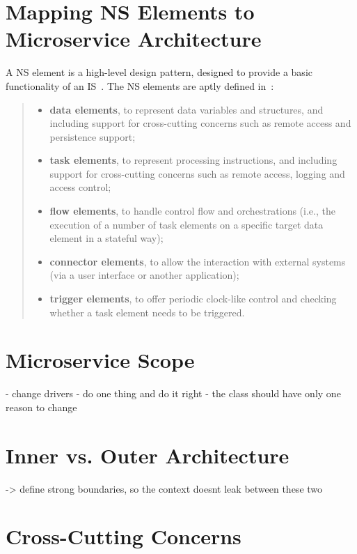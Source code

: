 \documentclass[thesis=M,english,hidelinks]{FITthesis}[2012/10/20]
\begin{document}
\section{Mapping NS Elements to Microservice Architecture}
\label{sec:mapping_ns_elems}

A \acrshort{NS} element is a high-level design pattern, designed to provide a basic functionality of an \acrlong{IS}~\cite{ns-toward-general-theory}. The \acrshort{NS} elements are aptly defined in~\cite{ns-in-practice}:
\begin{quote}
    \begin{itemize}
        \item \textbf{data elements}, to represent data variables and structures, and including support for cross-cutting concerns such as remote access and persistence support;
        \item \textbf{task elements}, to represent processing instructions, and including support for cross-cutting concerns such as remote access, logging and access control;
        \item \textbf{flow elements}, to handle control flow and orchestrations (i.e., the execution of a number of task elements on a specific target data element in a stateful way);
        \item \textbf{connector elements}, to allow the interaction with external systems (via a user interface or another application);
        \item \textbf{trigger elements}, to offer periodic clock-like control and checking whether a task element needs to be triggered.
    \end{itemize}
\end{quote}


\section{Microservice Scope}
- change drivers
- do one thing and do it right
- the class should have only one reason to change



\section{Inner vs. Outer Architecture}
\label{sec:appl:inout}
-> define strong boundaries, so the context doesnt leak between these two


\section{Cross-Cutting Concerns}
\label{sec:ccc}
\end{document}
